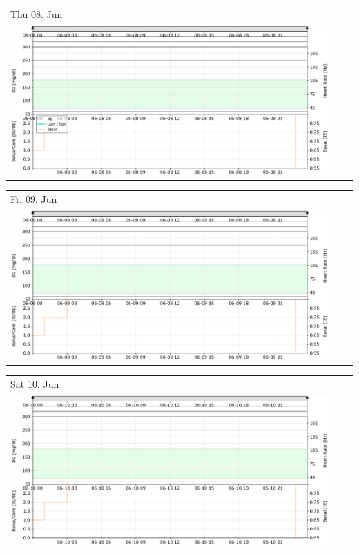 \newpage

\begin{tabularx}{\linewidth}{YYY}
Thu 08. Jun\\
\includegraphics[scale=0.53,keepaspectratio,trim={0 0 0 0},clip]{plot_daily_170608.png}
\end{tabularx}

\begin{tabularx}{\linewidth}{YYY}
Fri 09. Jun\\
\includegraphics[scale=0.53,keepaspectratio,trim={0 0 0 0},clip]{plot_daily_170609.png}
\end{tabularx}

\begin{tabularx}{\linewidth}{YYY}
Sat 10. Jun\\
\includegraphics[scale=0.53,keepaspectratio,trim={0 0 0 0},clip]{plot_daily_170610.png}
\end{tabularx}

